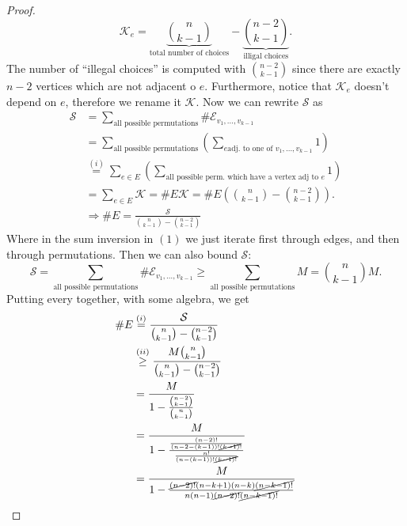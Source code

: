 \documentclass[11pt]{article}
\begin{document}
\begin{enumerate}
\begin{proof}
        \begin{equation*}
            \mathcal{K}_e = \underbrace{\binom{n}{k-1}}_{\text{total number of choices}}-\underbrace{\binom{n-2}{k-1}}_{\text{illigal choices}}.
        \end{equation*}
        The number of ``illegal choices'' is computed with $\binom{n-2}{k-1}$ since there are exactly $n-2$ vertices which are not adjacent o $e$. Furthermore, notice that $\mathcal{K}_e$ doesn't depend on $e$, therefore we rename it $\mathcal{K}$. Now we can rewrite $\mathcal{S}$ as 
        \begin{align*}
            \mathcal{S}&= \sum_{\text{all possible permutations}}\#\mathcal{E}_{v_1,\dots,v_{k-1}}\\
            & = \sum_{\text{all possible permutations}} \left(\sum_{e \text{adj. to one of $v_1,\dots,v_{k-1}$}}1\right)\\
            &\stackrel{(i)}{=}\sum_{e \in E}\left(\sum_{\text{all possible perm. which have a vertex adj to }e}1 \right)\\
            &=\sum_{e \in E}\mathcal{K} = \#E\mathcal{K} = \#E\left(\binom{n}{k-1} - \binom{n-2}{k-1}\right).\\
            & \Rightarrow \#E = \frac{\mathcal{S}}{\binom{n}{k-1} - \binom{n-2}{k-1}}
        \end{align*}  
        Where in the sum inversion in $(1)$ we just iterate first through edges, and then through permutations. Then we can also bound $\mathcal{S}$:
        \begin{equation*}
            \mathcal{S} = \sum_{\text{all possible permutations}}\#\mathcal{E}_{v_1,\dots,v_{k-1}} \geq \sum_{\text{all possible permutations}}M = \binom{n}{k-1}M.
        \end{equation*}
        Putting every together, with some algebra, we get
        \begin{align*}
            \# E &\stackrel{(i)}{=} \frac{\mathcal{S}}{\binom{n}{k-1} - \binom{n-2}{k-1}}\\
            &\stackrel{(ii)}{\geq} \frac{M\binom{n}{k-1}}{\binom{n}{k-1} - \binom{n-2}{k-1}}\\
            &=\frac{M}{1 - \frac{\binom{n-2}{k-1}}{\binom{n}{k-1}}}\\
            &=\frac{M}{1-\frac{\frac{(n-2)!}{(n-2-(k-1))!\cancel{(k-1)}!}}{\frac{n!}{(n-(k-1))!\cancel{(k-1)!}}}}\\
            &=\frac{M}{1-\frac{\cancel{(n-2)!}(n-k+1)(n-k)\cancel{(n-k-1)!}}{n(n-1)\cancel{(n-2)!}\cancel{(n-k-1)!}}}\\

\end{align*}
\end{proof}
\end{enumerate}
\end{document}

